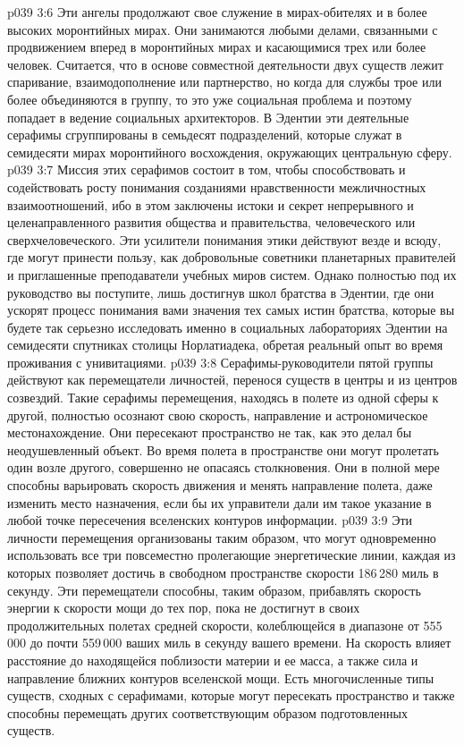 \vs p039 3:6 Эти ангелы продолжают свое служение в мирах\hyp{}обителях и в более высоких моронтийных мирах. Они занимаются любыми делами, связанными с продвижением вперед в моронтийных мирах и касающимися трех или более человек. Считается, что в основе совместной деятельности двух существ лежит спаривание, взаимодополнение или партнерство, но когда для службы трое или более объединяются в группу, то это уже социальная проблема и поэтому попадает в ведение социальных архитекторов. В Эдентии эти деятельные серафимы сгруппированы в семьдесят подразделений, которые служат в семидесяти мирах моронтийного восхождения, окружающих центральную сферу.
\vs p039 3:7 \pc {}\bibnobreakspace {} Миссия этих серафимов состоит в том, чтобы способствовать и содействовать росту понимания созданиями нравственности межличностных взаимоотношений, ибо в этом заключены истоки и секрет непрерывного и целенаправленного развития общества и правительства, человеческого или сверхчеловеческого. Эти усилители понимания этики действуют везде и всюду, где могут принести пользу, как добровольные советники планетарных правителей и приглашенные преподаватели учебных миров систем. Однако полностью под их руководство вы поступите, лишь достигнув школ братства в Эдентии, где они ускорят процесс понимания вами значения тех самых истин братства, которые вы будете так серьезно исследовать именно в социальных лабораториях Эдентии на семидесяти спутниках столицы Норлатиадека, обретая реальный опыт во время проживания с унивитациями.
\vs p039 3:8 \pc {}\bibnobreakspace {} Серафимы\hyp{}руководители пятой группы действуют как перемещатели личностей, перенося существ в центры и из центров созвездий. Такие серафимы перемещения, находясь в полете из одной сферы к другой, полностью осознают свою скорость, направление и астрономическое местонахождение. Они пересекают пространство не так, как это делал бы неодушевленный объект. Во время полета в пространстве они могут пролетать один возле другого, совершенно не опасаясь столкновения. Они в полной мере способны варьировать скорость движения и менять направление полета, даже изменить место назначения, если бы их управители дали им такое указание в любой точке пересечения вселенских контуров информации.
\vs p039 3:9 Эти личности перемещения организованы таким образом, что могут одновременно использовать все три повсеместно пролегающие энергетические линии, каждая из которых позволяет достичь в свободном пространстве скорости 186\,280 миль в секунду. Эти перемещатели способны, таким образом, прибавлять скорость энергии к скорости мощи до тех пор, пока не достигнут в своих продолжительных полетах средней скорости, колеблющейся в диапазоне от 555\,000 до почти 559\,000 ваших миль в секунду вашего времени. На скорость влияет расстояние до находящейся поблизости материи и ее масса, а также сила и направление ближних контуров вселенской мощи. Есть многочисленные типы существ, сходных с серафимами, которые могут пересекать пространство и также способны перемещать других соответствующим образом подготовленных существ.
